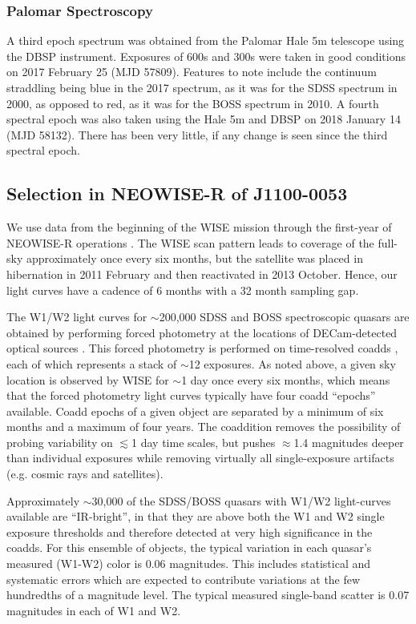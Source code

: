 \documentclass[11pt,a4paper]{article}
\begin{document}
\subsubsection{Palomar Spectroscopy} 
A third epoch spectrum was obtained from the Palomar Hale 5m telescope
using the DBSP instrument.  Exposures of 600s and 300s were taken in
good conditions on 2017 February 25 (MJD 57809). Features to note
include the continuum straddling \mgii being blue in the 2017
spectrum, as it was for the SDSS spectrum in 2000, as opposed to red,
as it was for the BOSS spectrum in 2010. A fourth spectral epoch was
also taken using the Hale 5m and DBSP on 2018 January 14 (MJD
58132). There has been very little, if any change is seen since the
third spectral epoch.


\subsection{Selection in NEOWISE-R of J1100-0053}
We use data from the beginning of the WISE mission \citep[2010
January; ][]{Wright2010} through the first-year of NEOWISE-R
operations \citep[2014 December; ][]{Mainzer2011}. The WISE scan pattern
leads to coverage of the full-sky approximately once every six months,
but the satellite was placed in hibernation in 2011 February and then
reactivated in 2013 October. Hence, our light curves have a cadence of
6 months with a 32 month sampling gap.

The W1/W2 light curves for $\sim$200,000 SDSS and BOSS spectroscopic
quasars are obtained by performing forced photometry at the locations
of DECam-detected optical sources \citep{Lang2014, Meisner2017a,
Meisner2017b}. This forced photometry is performed on time-resolved
coadds \citep{Lang2014}, each of which represents a stack of $\sim$12
exposures. As noted above, a given sky location is observed by WISE
for $\sim$1 day once every six months, which means that the forced
photometry light curves typically have four coadd ``epochs''
available. Coadd epochs of a given object are separated by a minimum
of six months and a maximum of four years. The coaddition removes the
possibility of probing variability on $\lesssim$1 day time scales, but
pushes $\approx$1.4 magnitudes deeper than individual exposures while
removing virtually all single-exposure artifacts (e.g. cosmic rays and
satellites).

Approximately $\sim$30,000 of the SDSS/BOSS quasars with W1/W2
light-curves available are ``IR-bright'', in that they are above both
the W1 and W2 single exposure thresholds and therefore detected at
very high significance in the coadds. For this ensemble of objects,
the typical variation in each quasar's measured (W1-W2) color is 0.06
magnitudes.  This includes statistical and systematic errors which are
expected to contribute variations at the few hundredths of a magnitude
level. The typical measured single-band scatter is 0.07 magnitudes in
each of W1 and W2.
\end{document}

